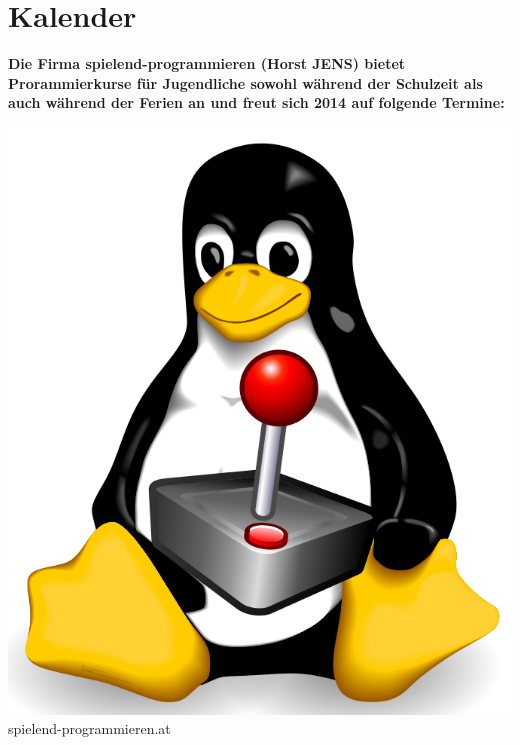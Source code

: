 \section*{Kalender}
\hypertarget{kalender}{}
\label{kalender}

\textbf{Die Firma spielend-programmieren (Horst JENS)  bietet Prorammierkurse für Jugendliche sowohl während der Schulzeit als auch während der Ferien an und freut sich 2014 auf folgende Termine:} 
\begin{center}
\includegraphics[width=0.9\linewidth]{kalender/tuxstick3.png}\\
\footnotesize{spielend-programmieren.at}
\end{center}
